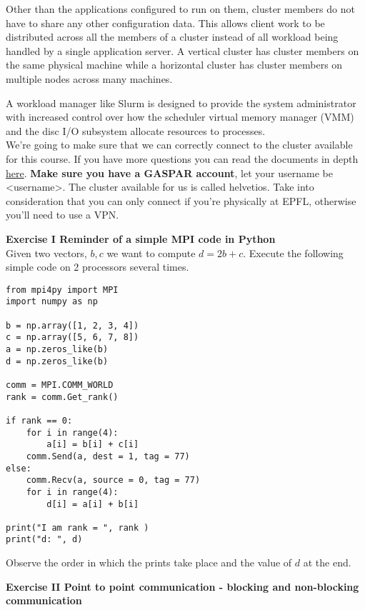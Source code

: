 \documentclass[11pt]{article}
\begin{document}
Other than the applications configured to run on them, cluster members do not have to share any other configuration data. This allows client work to be distributed across all the members of a cluster instead of all workload being handled by a single application server. A vertical cluster has cluster members on the same physical machine while a horizontal cluster has cluster members on multiple nodes across many machines. 

A workload manager like Slurm is designed to provide the system administrator with increased control over how the scheduler virtual memory manager (VMM) and the disc I/O subsystem allocate resources to processes. \\

We're going to make sure that we can correctly connect to the cluster available for this course. If you have more questions you can read the documents in depth \href{https://scitas-doc.epfl.ch/user-guide/using-clusters/connecting-to-the-clusters/}{here}. \textbf{Make sure you have a GASPAR account}, let your username be <username>. The cluster available for us is called helvetios. Take into consideration that you can only connect if you're physically at EPFL, otherwise you'll need to use a VPN. 

{\bf{Exercise I Reminder of a simple MPI code in Python}}\\

Given two vectors, $b, c$ we want to compute $d = 2b + c$. Execute the following simple code on 2 processors several times. 

\begin{verbatim}
from mpi4py import MPI 
import numpy as np  

b = np.array([1, 2, 3, 4])
c = np.array([5, 6, 7, 8])
a = np.zeros_like(b)
d = np.zeros_like(b)

comm = MPI.COMM_WORLD
rank = comm.Get_rank()

if rank == 0:
    for i in range(4):
        a[i] = b[i] + c[i]
    comm.Send(a, dest = 1, tag = 77)
else:
    comm.Recv(a, source = 0, tag = 77)
    for i in range(4):
        d[i] = a[i] + b[i]

print("I am rank = ", rank )
print("d: ", d)
\end{verbatim}

Observe the order in which the prints take place and the value of $d$ at the end. \\

\bigskip

{\bf{Exercise II Point to point communication - blocking and non-blocking communication}}\\
\end{document}
